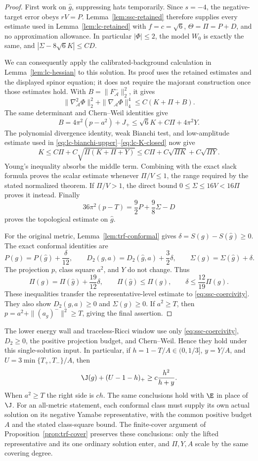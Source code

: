 \begin{proof}
First work on $\widehat g$, suppressing hats temporarily.  Since
$s=-4$, the negative-target error obeys $rV=P$.
Lemma~\ref{lem:ssc-retained} therefore supplies every estimate used in
Lemma~\ref{lem:lc-retained} with
$f=c=\sqrt6$, $\Theta=\Pi=P+D$, and no approximation allowance.
In particular $|\Phi|\le2$, the model $W_0$ is exactly the same,
and $|\Sigma-8\sqrt6K|\le CD$.

We can consequently apply the calibrated-background calculation in
Lemma~\ref{lem:lc-hessian} to this solution.  Its proof uses the
retained estimates and the displayed spinor equation; it does not
require the majorant construction once those estimates hold.
With $B=\|F_{\mathcal A}^-\|_2^2$, it gives
\[
 \|\nabla_{\mathcal A}^2\Phi\|_2^2+
       \|\nabla_{\mathcal A}\Phi\|_4^4\le C(K+\Pi+B).
\]
The same determinant and Chern--Weil identities give
\[
 B=4\pi^2(p-a^2)+J_+\le\sqrt6K+C\Pi+4\pi^2Y.
\]
The polynomial divergence identity, weak Bianchi test, and
low-amplitude estimate used in
\eqref{eq:lc-bianchi-upper}--\eqref{eq:lc-K-closed} now give
\[
 K\le C\Pi+C\sqrt{\Pi(K+\Pi+Y)}
   \le C\Pi+C\sqrt{\Pi K}+C\sqrt{\Pi Y}.
\]
Young's inequality absorbs the middle term.  Combining with the exact
slack formula proves the scalar estimate whenever $\Pi/V\le1$,
the range required by the stated normalized theorem.  If $\Pi/V>1$,
the direct bound $0\le\Sigma\le16V<16\Pi$ proves it instead.
Finally
\[
 36\pi^2(p-T)=\frac92P+\frac98\Sigma-D
\]
proves the topological estimate on $\widehat g$.

For the original metric, Lemma~\ref{lem:trf-conformal} gives
$\delta=S(g)-S(\widehat g)\ge0$.  The exact conformal identities are
\[
 P(g)=P(\widehat g)+\frac\delta{12},\qquad
 D_2(g,a)=D_2(\widehat g,a)+\frac32\delta,\qquad
 \Sigma(g)=\Sigma(\widehat g)+\delta.
\]
The projection $p$, class square $a^2$, and $Y$ do not change.
Thus
\[
 \Pi(g)=\Pi(\widehat g)+\frac{19}{12}\delta,
 \qquad \Pi(\widehat g)\le\Pi(g),\qquad
 \delta\le\frac{12}{19}\Pi(g).
\]
These inequalities transfer the representative-level estimate to
\eqref{eq:ssc-coercivity}.  They also show $D_2(g,a)\ge0$ and
$\Sigma(g)\ge0$.  If $a^2\ge T$, then
$p=a^2+\|(a_g)^-\|^2\ge T$, giving the final assertion.
\end{proof}

The lower energy wall and traceless-Ricci window use only
\eqref{eq:ssc-coercivity}, $D_2\ge0$, the positive projection budget,
and Chern--Weil.  Hence they hold under this single-solution input.
In particular, if $h=1-T/A\in(0,1/3]$, $y=Y/A$, and
$U=3\min\{T_+,T_-\}/A$, then
\begin{equation}\label{eq:ssc-linear-window}
 \J(g)+(U-1-h)_+\ge c\frac{h^2}{h+y}.
\end{equation}
When $a^2\ge T$ the right side is $ch$.  The same conclusions hold
with $\E$ in place of $\J$.  For an all-metric statement, each
conformal class must supply its own actual solution on its negative
Yamabe representative, with the common positive budget $A$ and the
stated class-square bound.  The finite-cover argument of
Proposition~\ref{prop:trf-cover} preserves these conclusions: only
the lifted representative and its one ordinary solution enter, and
$\Pi,Y,A$ scale by the same covering degree.

